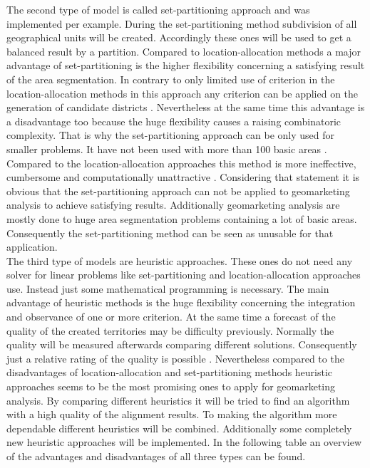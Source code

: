 The second type of model is called set-partitioning approach and was implemented \citeauthor{mehrotra}\cite{mehrotra} per example. During the set-partitioning method subdivision of all geographical units will be created. Accordingly these ones will be used to get a balanced result by a partition. Compared to location-allocation methods a major advantage of set-partitioning is the higher flexibility concerning a satisfying result of the area segmentation. In contrary to only limited use of criterion in the location-allocation methods in this approach any criterion can be applied on the generation of candidate districts \cite{kalcsics}. Nevertheless at the same time this advantage is a disadvantage too because the huge flexibility causes a raising combinatoric complexity. That is why the set-partitioning approach can be only used for smaller problems. It have not been used with more than 100 basic areas \cite{kalcsics}. Compared to the location-allocation approaches this method is more ineffective, cumbersome and computationally unattractive \cite{zoltner}. Considering that statement it is obvious that the set-partitioning approach can not be applied to geomarketing analysis to achieve satisfying results. Additionally geomarketing analysis are mostly done to huge area segmentation problems containing a lot of basic areas. Consequently the set-partitioning method can be seen as unusable for that application. \\
The third type of models are heuristic approaches. These ones do not need any solver for linear problems like set-partitioning and location-allocation approaches use. Instead just some mathematical programming is necessary. The main advantage of heuristic methods is the huge flexibility concerning the integration and observance of one or more criterion. At the same time a forecast of the quality of the created territories may be difficulty previously. Normally the quality will be measured afterwards comparing different solutions. Consequently just a relative rating of the quality is possible \cite{schroeder}. Nevertheless compared to the disadvantages of location-allocation and set-partitioning methods heuristic approaches seems to be the most promising ones to apply for geomarketing analysis. By comparing different heuristics it will be tried to find an algorithm with a high quality of the alignment results. To making the algorithm more dependable different heuristics will be combined. Additionally some completely new heuristic approaches will be implemented. In the following table an overview of the advantages and disadvantages of all three types can be found.

